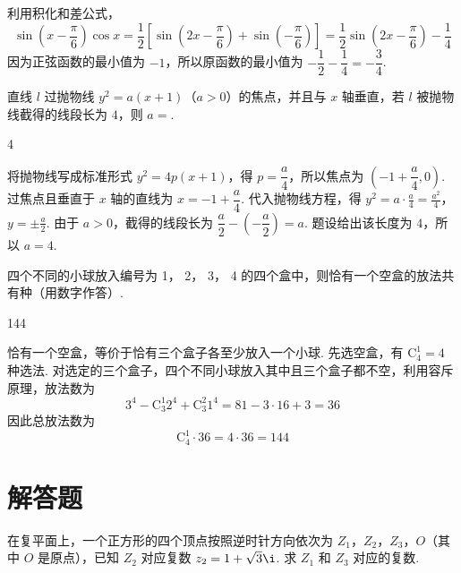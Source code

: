 \begin{solution}
利用积化和差公式，
\[
\sin\left(x-\frac{\pi}{6}\right)\cos x
=\frac12\left[\sin\left(2x-\frac{\pi}{6}\right)+\sin\left(-\frac{\pi}{6}\right)\right]
=\frac12\sin\left(2x-\frac{\pi}{6}\right)-\frac14
\]
因为正弦函数的最小值为 \(-1\)，所以原函数的最小值为 \(-\dfrac12-\dfrac14=-\dfrac34\).
\end{solution}

\begin{problem}
直线 \(l\) 过抛物线 \(y^{2} = a(x + 1)\)（\(a > 0\)）的焦点，并且与 \(x\) 轴垂直，若 \(l\) 被抛物线截得的线段长为 \(4\)，则 \(a = \)\fillinblank{}.
\end{problem}

\begin{answer}
4
\end{answer}

\begin{solution}
将抛物线写成标准形式 \(y^2=4p(x+1)\)，得 \(p=\dfrac a4\)，所以焦点为 \(\left(-1+\dfrac a4,0\right)\). 过焦点且垂直于 \(x\) 轴的直线为 \(x=-1+\dfrac a4\). 代入抛物线方程，得
\(y^2=a\cdot\frac a4=\frac{a^2}{4}\)，\(y=\pm\frac a2\).
由于 \(a>0\)，截得的线段长为 \(\dfrac a2-\left(-\dfrac a2\right)=a\). 题设给出该长度为 \(4\)，所以 \(a=4\).
\end{solution}

\begin{problem}
四个不同的小球放入编号为 1， 2， 3， 4 的四个盒中，则恰有一个空盒的放法共有\fillinblank{}种（用数字作答）.
\end{problem}

\begin{answer}
144
\end{answer}

\begin{solution}
恰有一个空盒，等价于恰有三个盒子各至少放入一个小球. 先选空盒，有 \(\mathrm C_4^1=4\) 种选法. 对选定的三个盒子，四个不同小球放入其中且三个盒子都不空，利用容斥原理，放法数为
\[
3^4-\mathrm C_3^1 2^4+\mathrm C_3^2 1^4
=81-3\cdot16+3=36
\]
因此总放法数为
\[
\mathrm C_4^1\cdot36=4\cdot36=144
\]
\end{solution}

\section{解答题}

\begin{problem}
在复平面上，一个正方形的四个顶点按照逆时针方向依次为 \(Z_{1}\)，\(Z_{2}\)，\(Z_{3}\)，\(O\)（其中 \(O\) 是原点），已知 \(Z_{2}\) 对应复数 \(z_{2} = 1 + \sqrt{3} \i\). 求 \(Z_{1}\) 和 \(Z_{3}\) 对应的复数.
\end{problem}

